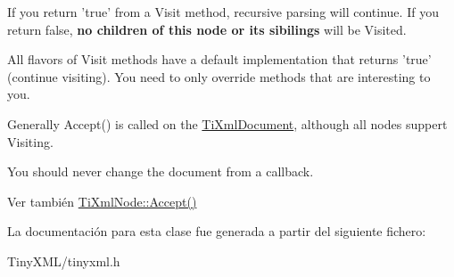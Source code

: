 If you return 'true' from a Visit method, recursive parsing will continue. If you return false, {\bfseries no children of this node or its sibilings} will be Visited.

All flavors of Visit methods have a default implementation that returns 'true' (continue visiting). You need to only override methods that are interesting to you.

Generally Accept() is called on the \hyperlink{class_ti_xml_document}{Ti\-Xml\-Document}, although all nodes suppert Visiting.

You should never change the document from a callback.

\begin{DoxySeeAlso}{Ver también}
\hyperlink{class_ti_xml_node_acc0f88b7462c6cb73809d410a4f5bb86}{Ti\-Xml\-Node\-::\-Accept()} 
\end{DoxySeeAlso}


La documentación para esta clase fue generada a partir del siguiente fichero\-:\begin{DoxyCompactItemize}
\item 
Tiny\-X\-M\-L/tinyxml.\-h\end{DoxyCompactItemize}
